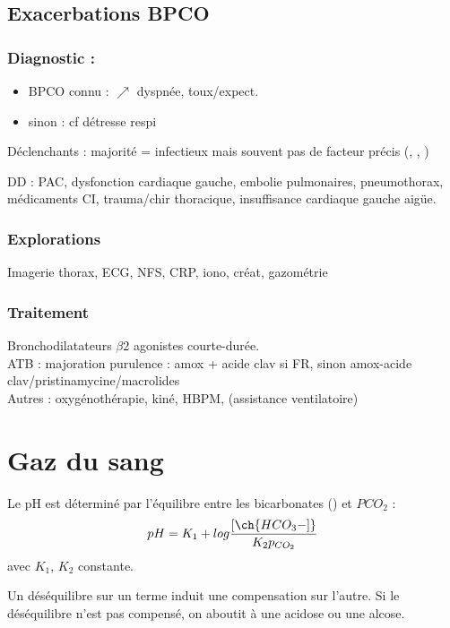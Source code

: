 \documentclass{article}
\begin{document}
\subsection{Exacerbations BPCO}
\label{subsec:ebpco}
\subsubsection{Diagnostic :}
\begin{itemize}
\item BPCO connu : \(\nearrow\) dyspnée, toux/expect.
\item sinon : cf détresse respi
\end{itemize}

Déclenchants : majorité = infectieux mais souvent pas de facteur précis
(, , )

DD : PAC, dysfonction cardiaque gauche, embolie pulmonaires, pneumothorax, médicaments CI, trauma/chir thoracique, insuffisance cardiaque gauche aigüe.

\subsubsection{Explorations}
Imagerie thorax, ECG, NFS, CRP, iono, créat, gazométrie

\subsubsection{Traitement}
Bronchodilatateurs $\beta2$ agonistes courte-durée.\\
ATB : majoration purulence : amox + acide clav si FR, sinon amox-acide
clav/pristinamycine/macrolides\\
Autres \faHospitalSign : oxygénothérapie, kiné, HBPM, (assistance ventilatoire)

\appendix

\section{Gaz du sang}
\label{appendix:gds}
Le pH est déterminé par l'équilibre entre les bicarbonates () et
$PCO_2$ :
\begin{equation}
  pH = K_1 + log\frac{[\ch{HCO_3-]}}{K_2 p_{CO_2}}
\end{equation}
avec $K_1$, $K_2$ constante.

Un déséquilibre sur un terme induit une compensation sur l'autre. Si le
déséquilibre n'est pas compensé, on aboutit à une acidose ou une alcose.
\end{document}
